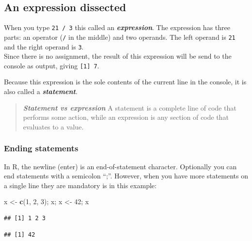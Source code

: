 \documentclass[]{book}
\newenvironment{Shaded}{\begin{snugshade}}{\end{snugshade}}
\newcommand{\DecValTok}[1]{\textcolor[rgb]{0.00,0.00,0.81}{#1}}
\newcommand{\KeywordTok}[1]{\textcolor[rgb]{0.13,0.29,0.53}{\textbf{#1}}}
\newcommand{\NormalTok}[1]{#1}
\newcommand{\StringTok}[1]{\textcolor[rgb]{0.31,0.60,0.02}{#1}}
\begin{document}
\hypertarget{an-expression-dissected}{%
\subsection{An expression dissected}\label{an-expression-dissected}}

When you type \texttt{21\ /\ 3} this called an \textbf{\emph{expression}}. The expression has three parts: an operator (\texttt{/} in the middle) and two operands. The left operand is \texttt{21} and the right operand is \texttt{3}.\\
Since there is no assignment, the result of this expression will be send to the console as output, giving \texttt{{[}1{]}\ 7}.

Because this expression is the sole contents of the current line in the console, it is also called a \textbf{\emph{statement}}.

\begin{quote}
\textbf{\emph{Statement vs expression}} A statement is a complete line of code that performs some action, while an expression is any section of code that evaluates to a value.
\end{quote}

\hypertarget{ending-statements}{%
\subsubsection*{Ending statements}\label{ending-statements}}

In R, the newline (enter) is an end-of-statement character. Optionally you can end statements with a semicolon ``;''. However, when you have more statements on a single line they are mandatory is in this example:

\begin{Shaded}
\begin{Highlighting}[]
\NormalTok{x <-}\StringTok{ }\KeywordTok{c}\NormalTok{(}\DecValTok{1}\NormalTok{, }\DecValTok{2}\NormalTok{, }\DecValTok{3}\NormalTok{); x; x <-}\StringTok{ }\DecValTok{42}\NormalTok{; x}
\end{Highlighting}
\end{Shaded}

\begin{verbatim}
## [1] 1 2 3
\end{verbatim}

\begin{verbatim}
## [1] 42
\end{verbatim}
\end{document}
